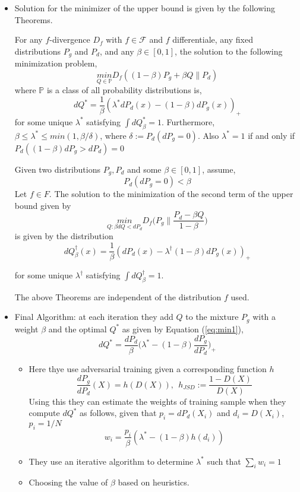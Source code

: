\begin{itemize}
\item Solution for the minimizer of the upper bound is given by the following Theorems.
\begin{theorem}
For any $f$-divergence $D_f$ with $f\in \mathcal{F}$ and $f$ differentiale, any fixed distributions $P_g$ and $P_d$, and any $\beta \in [0, 1]$, the solution to the following minimization problem,
$$ \underset{Q \in \mathbb{P}}{min}D_{f}\left((1-\beta) P_{g}+\beta Q \| P_{d}\right) $$ where $\mathbb{P}$ is a class of all probability distributions is,
\begin{equation}
\label{eq:min1}
dQ^* = \frac{1}{\beta} (\lambda^* dP_d(x) - (1-\beta)dP_g(x))_{+}
\end{equation}
for some unique $\lambda^*$ satisfying $\int dQ^*_{\beta} = 1$. Furthermore, $\beta \leq \lambda^*\leq min(1, \beta/\delta)$, where $\delta := P_d(dP_g = 0)$. Also $\lambda^* = 1$ if and only if $P_d((1 - \beta)dP_g > dP_d) = 0$
\end{theorem}{}
\begin{theorem}
Given two distributions $P_g, P_d$ and some $\beta \in [0, 1]$, assume,
$$P_d(dP_g = 0) < \beta$$ Let $f\in F$. The solution to the minimization of the second term of the upper bound given by
$$\underset{Q:\beta dQ<dP_d}{min} D_f\bigg( P_g \parallel \frac{P_d - \beta Q}{1 - \beta}\bigg)$$
is given by the distribution
\begin{equation}
    \label{eq:min2}
  dQ_{\beta}^{\dagger}(x) = \frac{1}{\beta}(dP_d(x) - \lambda^{\dagger}(1 - \beta)dP_g (x))_+  
\end{equation}{}

for some unique $\lambda^{\dagger}$ satisfying $\int dQ^{\dagger}_{\beta} = 1$.
\end{theorem}{}
The above Theorems are independent of the distribution $f$ used.
\item Final Algorithm:
at each iteration they add $Q$ to the mixture $P_g$ with a weight $\beta$ and the optimal $Q^*$ as given by Equation (\ref{eq:min1}),
$$dQ^* = \frac{dP_d}{\beta} \bigg( \lambda^* - (1 - \beta) \frac{dP_g}{dP_d}\bigg)_+$$
\begin{itemize}
    \item Here thye use adversarial training given a corresponding function $h$
    $$\frac{dP_g}{dP_d}(X) = h(D(X)), \ \ h_{JSD} := \frac{1-D(X)}{D(X)}$$
    Using this they can estimate the weights of training sample when they compute $dQ^*$ as follows, given that $p_i = dP_d(X_i)$ and $d_i = D(X_i)$, $p_i = 1/N$
    $$w_i = \frac{p_i}{\beta} (\lambda^* - (1- \beta)h(d_i))$$
    \item They use an iterative algorithm to determine $\lambda^*$ such that $\sum_i w_i = 1$
    \item Choosing the value of $\beta$ based on heuristics.
\end{itemize}{}


\end{itemize}
